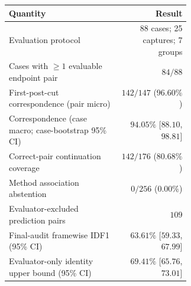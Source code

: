 \begin{tabular}{p{0.61\linewidth}r}
\toprule
Quantity & Result \\
\midrule
Evaluation protocol & 88 cases; 25 captures; 7 groups \\
Cases with $\geq 1$ evaluable endpoint pair & $84/88$ \\
First-post-cut correspondence (pair micro) & $142/147$ ($96.60\%$) \\
Correspondence (case macro; case-bootstrap 95\% CI) & $94.05\%$ [$88.10$, $98.81$] \\
Correct-pair continuation coverage & $142/176$ ($80.68\%$) \\
Method association abstention & $0/256$ ($0.00\%$) \\
Evaluator-excluded prediction pairs & $109$ \\
Final-audit framewise IDF1 (95\% CI) & $63.61\%$ [$59.33$, $67.99$] \\
Evaluator-only identity upper bound (95\% CI) & $69.41\%$ [$65.76$, $73.01$] \\
\bottomrule
\end{tabular}
